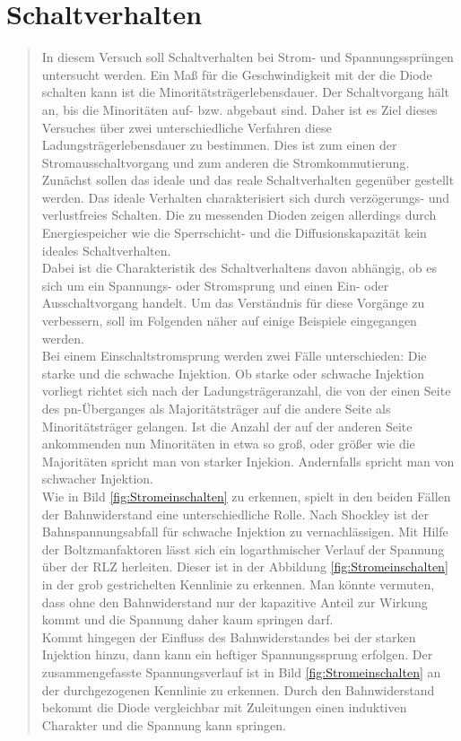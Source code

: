 \section{Schaltverhalten}
\begin{quote}

	In diesem Versuch soll Schaltverhalten bei Strom- und Spannungssprüngen
	untersucht werden. Ein Maß für die Geschwindigkeit mit der die Diode
	schalten kann ist die Minoritätsträgerlebensdauer. Der Schaltvorgang hält
	an, bis die Minoritäten auf- bzw. abgebaut sind. Daher ist es Ziel dieses 
	Versuches über zwei unterschiedliche Verfahren diese 
	Ladungsträgerlebensdauer zu bestimmen. Dies ist zum einen der 
	Stromausschaltvorgang und zum anderen die Stromkommutierung.\\
	
	Zunächst sollen das ideale und das reale Schaltverhalten gegenüber gestellt
	werden. Das ideale Verhalten charakterisiert sich durch verzögerungs- und
	verlustfreies Schalten. Die zu messenden Dioden zeigen allerdings durch
	Energiespeicher wie die Sperrschicht- und die Diffusionskapazität kein
	ideales Schaltverhalten. \\

	Dabei ist die Charakteristik des Schaltverhaltens davon abhängig, ob es
	sich um ein Spannungs- oder Stromsprung und einen Ein- oder Ausschaltvorgang
	handelt. Um das Verständnis für diese Vorgänge zu verbessern, soll im
	Folgenden näher auf einige Beispiele eingegangen werden.\\

	Bei einem Einschaltstromsprung werden zwei Fälle unterschieden: Die starke
	und die schwache Injektion. Ob starke oder schwache Injektion vorliegt
	richtet sich nach der Ladungsträgeranzahl, die von der einen Seite des
	pn-Überganges als Majoritätsträger auf die andere Seite als Minoritätsträger
	gelangen. Ist die Anzahl der auf der anderen Seite ankommenden nun
	Minoritäten in etwa so groß, oder größer wie die Majoritäten spricht man von
	starker Injekion. Andernfalls spricht man von schwacher Injektion.\\
    Wie in Bild \ref{fig:Stromeinschalten} zu erkennen, spielt in den beiden
    Fällen der Bahnwiderstand eine unterschiedliche Rolle. Nach Shockley ist der
    Bahnspannungsabfall für schwache Injektion zu vernachlässigen. Mit Hilfe der
    Boltzmanfaktoren lässt sich ein logarthmischer Verlauf der Spannung über der
    RLZ herleiten. Dieser ist in der Abbildung \ref{fig:Stromeinschalten} in der
    grob gestrichelten Kennlinie zu erkennen. Man könnte vermuten, dass ohne den
    Bahnwiderstand nur der kapazitive Anteil zur Wirkung kommt und die Spannung
	daher kaum springen darf.\\
	Kommt hingegen der Einfluss des Bahnwiderstandes bei der starken Injektion
	hinzu, dann kann ein heftiger Spannungssprung erfolgen. Der zusammengefasste 
	Spannungsverlauf ist in Bild \ref{fig:Stromeinschalten} an der 
	durchgezogenen Kennlinie zu erkennen. Durch den Bahnwiderstand bekommt die 
	Diode vergleichbar mit Zuleitungen einen induktiven Charakter und die 
	Spannung kann springen.


\end{quote}

